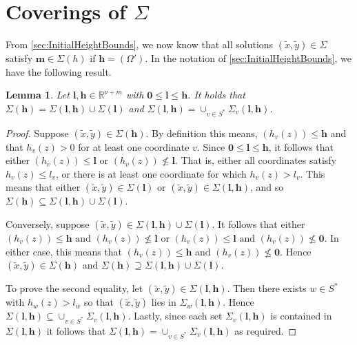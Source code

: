 \documentclass[11pt]{report}
\newtheorem{lemma}[theorem]{Lemma}
\theoremstyle{definition}
\begin{document}

\section{Coverings of $\Sigma$}
\label{sec:CoveringsofSigma}

From \autoref{sec:InitialHeightBounds}, we now know that all solutions $(\tilde{x},\tilde{y}) \in \Sigma$ satisfy $\mathbf{m}\in \Sigma(h)$ if ${\mathbf{h} = (\Omega')}$. In the notation of \autoref{sec:InitialHeightBounds}, we have the following result.

\begin{lemma}\label{lem:covering}
Let $\mathbf{l},\mathbf{h}\in\mathbb{R}^{\nu+m}$ with $\mathbf{0}\leq \mathbf{l}\leq \mathbf{h}$. It holds that $\Sigma(\mathbf{h})=\Sigma(\mathbf{l},\mathbf{h})\cup \Sigma(\mathbf{l})$ and $\Sigma(\mathbf{l},\mathbf{h})=\cup_{v \in S^*}\Sigma_v(\mathbf{l},\mathbf{h})$.
\end{lemma}

\begin{proof}
Suppose $(\tilde{x},\tilde{y}) \in \Sigma(\mathbf{h})$. By definition this means, $(h_v(z))\leq \mathbf{h}$ and that $h_v(z) > 0$ for at least one coordinate $v$. Since $\mathbf{0} \leq \mathbf{l} \leq \mathbf{h}$, it follows that either $(h_v(z))\leq \mathbf{l}$ or $(h_v(z))\nleq \mathbf{l}$. That is, either all coordinates satisfy $h_v(z) \leq l_v$, or there is at least one coordinate for which $h_v(z) > l_v$. This means that either $(\tilde{x},\tilde{y}) \in \Sigma(\mathbf{l})$ or $(\tilde{x},\tilde{y}) \in \Sigma(\mathbf{l},\mathbf{h})$, and so $\Sigma(\mathbf{h}) \subseteq \Sigma(\mathbf{l},\mathbf{h}) \cup \Sigma(\mathbf{l})$.

Conversely, suppose  $(\tilde{x},\tilde{y}) \in \Sigma(\mathbf{l},\mathbf{h}) \cup \Sigma(\mathbf{l})$. It follows that either $(h_v(z))\leq \mathbf{h} \text{ and } (h_v(z))\nleq \mathbf{l}$ or $(h_v(z))\leq \mathbf{l} \text{ and } (h_v(z))\nleq \mathbf{0}$. In either case, this means that $(h_v(z)) \leq \mathbf{h}$ and $(h_v(z)) \nleq \mathbf{0}$. Hence $(\tilde{x},\tilde{y}) \in \Sigma(\mathbf{h})$ and $\Sigma(\mathbf{h}) \supseteq \Sigma(\mathbf{l},\mathbf{h}) \cup \Sigma(\mathbf{l})$.

To prove the second equality, let $(\tilde{x},\tilde{y}) \in \Sigma(\mathbf{l},\mathbf{h})$. Then there exists $w\in S^*$ with $h_w(z)>l_w$ so that $(\tilde{x},\tilde{y})$ lies in $\Sigma_w(\mathbf{l},\mathbf{h})$. Hence $\Sigma(\mathbf{l},\mathbf{h}) \subseteq \cup_{v\in S^*}\Sigma_v(\mathbf{l},\mathbf{h})$. Lastly, since each set $\Sigma_v(\mathbf{l},\mathbf{h})$ is contained in $\Sigma(\mathbf{l},\mathbf{h})$ it follows that $\Sigma(\mathbf{l},\mathbf{h})=\cup_{v\in S^*}\Sigma_v(\mathbf{l},\mathbf{h})$ as required.
\end{proof}
\end{document}
